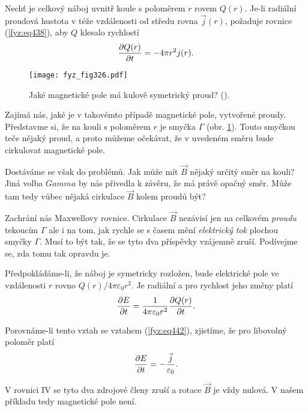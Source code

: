   Nechť je celkový náboj uvnitř koule s poloměrem \(r\) rovem \(Q(r)\). Je-li radiální proudová 
  hustota v téže vzdálenosti od středu rovna \(\vec{j}(r)\), požaduje rovnice (\ref{fyz:eq438}), 
  aby \(Q\) klesalo rychlostí
  \begin{equation}\label{fyz:eq442}
    \dfrac{\partial Q(r)}{\partial t} = - 4\pi r^2j(r).
  \end{equation}
  
  \begin{figure}[ht!]  %
    \centering
    \texttt{[image: fyz\_fig326.pdf]}
    \caption{Jaké magnetické pole má kulově symetrický proud?
             (\cite[s.~320]{Feynman02}).}
    \label{fyz:fig326}
  \end{figure}
  
  Zajímá nás, jaké je v takovémto případě magnetické pole, vytvořené proudy. Představme si, že na 
  kouli s poloměrem \(r\) je smyčka \(\Gamma\) (obr. \ref{fyz:fig326}). Touto smyčkou teče nějaký 
  proud, a proto můžeme očekávat, že v uvedeném směru bude cirkulovat magnetické pole.
  
  Dostáváme se však do problémů. Jak může mít \(\vec{B}\) nějaký určitý směr na kouli? Jiná volba 
  \(Gamma\) by nás přivedla k závěru, že má právě opačný směr. Může tam tedy vůbec nějaká cirkulace 
  \(\vec{B}\) kolem proudů být?
  
  Zachrání nás Maxwellovy rovnice. Cirkulace \(\vec{B}\) nezávisí jen na celkovém \emph{proudu} 
  tekoucím \(\Gamma\) ale i na tom, jak rychle se s časem mění \emph{elektrický tok} plochou smyčky 
  \(\Gamma\). Musí to být tak, že se tyto dva příspěvky vzájemně zruší. Podívejme se, zda tomu tak 
  opravdu je. 
  
  Předpokládáme-li, že náboj je symetricky rozložen, bude elektrické pole ve vzdálenosti \(r\) 
  rovno \(Q(r)/4\pi\varepsilon_0 r^2\). Je radiální a pro rychlost jeho změny platí
  \begin{equation}\label{fyz:eq443}
    \dfrac{\partial E}{\partial t} =  \frac{1}{4\pi\varepsilon_0 r^2}\dfrac{\partial Q(r)}{\partial t}.
  \end{equation}
  
  Porovnáme-li tento vztah se vztahem (\ref{fyz:eq442}), zjistíme, že pro libovolný poloměr platí
  \begin{equation}\label{fyz:eq444}
    \dfrac{\partial E}{\partial t} =  -\frac{\vec{j}}{\varepsilon_0}.
  \end{equation}
  
  V rovnici IV se tyto dva zdrojové členy zruší a rotace \(\vec{B}\) je vždy nulová. V našem 
  příkladu tedy magnetické pole není.
  
